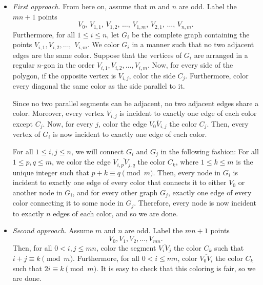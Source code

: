 \begin{itemize}
    \item \textit{First approach.} From here on, assume that $m$ and $n$ are odd. Label the $mn+1$ points \[V_0,\,V_{1,1},\,V_{1,2},\,\ldots,\,V_{1,m},\,V_{2,1},\,\ldots,\,V_{n,m}.\]
        Furthermore, for all $1\le i\le n$, let $G_i$ be the complete graph containing the points $V_{i,1},V_{i,2},\ldots,$ $V_{i,m}$. We color $G_i$ in a manner such that no two adjacent edges are the same color. Suppose that the vertices of $G_i$ are arranged in a regular $n$-gon in the order $V_{i,1},V_{i,2},\ldots,V_{i,m}$. Now, for every side of the polygon, if the opposite vertex is $V_{i,j}$, color the side $C_j$. Furthermore, color every diagonal the same color as the side parallel to it.

        Since no two parallel segments can be adjacent, no two adjacent edges share a color. Moreover, every vertex $V_{i,j}$ is incident to exactly one edge of each color except $C_j$. Now, for every $j$, color the edge $\overline{V_0V_{i,j}}$  the color $C_j$. Then, every vertex of $G_i$ is now incident to exactly one edge of each color.

        For all $1\le i,j\le n$, we will connect $G_i$ and $G_j$ in the following fashion: For all $1\le p,q\le m$, we color the edge $\overline{V_{i,p}V_{j,q}}$ the color $C_k$, where $1\le k\le m$ is the unique integer such that $p+k\equiv q\pmod{m}$. Then, every node in $G_i$ is incident to exactly one edge of every color that connects it to either $V_0$ or another node in $G_i$, and for every other graph $G_j$, exactly one edge of every color connecting it to some node in $G_j$. Therefore, every node is now incident to exactly $n$ edges of each color, and so we are done.

    \item \textit{Second approach.} Assume $m$ and $n$ are odd. Label the $mn+1$ points \[V_0,V_1,V_2,\ldots,V_{mn}.\]
        Then, for all $0<i,j\le mn$, color the segment $\overline{V_iV_j}$ the color $C_k$ such that $i+j\equiv k\pmod{m}$. Furthermore, for all $0<i\le mn$, color $\overline{V_0V_i}$ the color $C_k$ such that $2i\equiv k\pmod{m}$. It is easy to check that this coloring is fair, so we are done.
\end{itemize}
